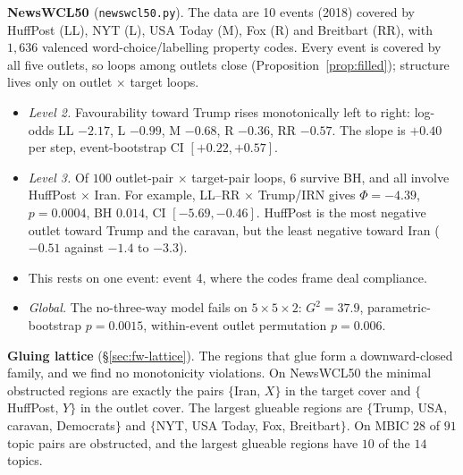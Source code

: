 \documentclass[11pt]{article}
\theoremstyle{definition}
\theoremstyle{remark}
\begin{document}
\textbf{NewsWCL50 \cite{newswcl50}} (\texttt{newswcl50.py}). The data are 10 events (2018) covered by HuffPost (LL), NYT (L), USA Today (M), Fox (R) and Breitbart (RR), with $1{,}636$ valenced word-choice/labelling property codes. Every event is covered by all five outlets, so loops among outlets close (Proposition~\ref{prop:filled}); structure lives only on outlet $\times$ target loops.
\begin{itemize}
  \item \emph{Level 2.} Favourability toward Trump rises monotonically left to right: log-odds LL $-2.17$, L $-0.99$, M $-0.68$, R $-0.36$, RR $-0.57$. The slope is $+0.40$ per step, event-bootstrap CI $[+0.22,+0.57]$.
  \item \emph{Level 3.} Of $100$ outlet-pair $\times$ target-pair loops, $6$ survive BH, and all involve HuffPost $\times$ Iran. For example, LL--RR $\times$ Trump/IRN gives $\Phi=-4.39$, $p=0.0004$, BH $0.014$, CI $[-5.69,-0.46]$. HuffPost is the most negative outlet toward Trump and the caravan, but the least negative toward Iran ($-0.51$ against $-1.4$ to $-3.3$).
  \item This rests on one event: event 4, where the codes frame deal compliance.
  \item \emph{Global.} The no-three-way model fails on $5\times5\times2$: $G^2=37.9$, parametric-bootstrap $p=0.0015$, within-event outlet permutation $p=0.006$.
\end{itemize}

\textbf{Gluing lattice} (\S\ref{sec:fw-lattice}). The regions that glue form a downward-closed family, and we find no monotonicity violations. On NewsWCL50 the minimal obstructed regions are exactly the pairs $\{$Iran, $X\}$ in the target cover and $\{$HuffPost, $Y\}$ in the outlet cover. The largest glueable regions are $\{$Trump, USA, caravan, Democrats$\}$ and $\{$NYT, USA Today, Fox, Breitbart$\}$. On MBIC $28$ of $91$ topic pairs are obstructed, and the largest glueable regions have $10$ of the $14$ topics.
\end{document}
